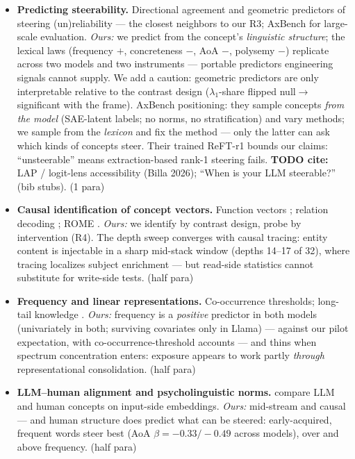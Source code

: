 \documentclass[11pt]{article}
\newenvironment{outline}{\color{gray!70!black}\begin{itemize}[leftmargin=1.2em,itemsep=1pt]}{\end{itemize}\color{black}}
\begin{document}
\begin{outline}
\item \textbf{Predicting steerability.} Directional agreement and geometric predictors of steering (un)reliability \citep{braun2025unreliability,braun2026geometric} --- the closest neighbors to our R3; AxBench \citep{wu2025axbench} for large-scale evaluation. \emph{Ours:} we predict from the concept's \emph{linguistic structure}; the lexical laws (frequency $+$, concreteness $-$, AoA $-$, polysemy $-$) replicate across two models and two instruments --- portable predictors engineering signals cannot supply. We add a caution: geometric predictors are only interpretable relative to the contrast design ($\lambda_1$-share flipped null$\to$significant with the frame). AxBench positioning: they sample concepts \emph{from the model} (SAE-latent labels; no norms, no stratification) and vary methods; we sample from the \emph{lexicon} and fix the method --- only the latter can ask which kinds of concepts steer. Their trained ReFT-r1 bounds our claims: ``unsteerable'' means extraction-based rank-1 steering fails. \textbf{TODO cite:} LAP / logit-lens accessibility (Billa 2026); ``When is your LLM steerable?'' (bib stubs). (1 para)
\item \textbf{Causal identification of concept vectors.} Function vectors \citep{todd2024function}; relation decoding \citep{hernandez2024linearity}; ROME \citep{meng2022rome}. \emph{Ours:} we identify by contrast design, probe by intervention (R4). The depth sweep converges with causal tracing: entity content is injectable in a sharp mid-stack window (depths 14--17 of 32), where tracing localizes subject enrichment --- but read-side statistics cannot substitute for write-side tests. (half para)
\item \textbf{Frequency and linear representations.} Co-occurrence thresholds; long-tail knowledge \citep{kandpal2023longtail}. \emph{Ours:} frequency is a \emph{positive} predictor in both models (univariately in both; surviving covariates only in Llama) --- against our pilot expectation, with co-occurrence-threshold accounts --- and thins when spectrum concentration enters: exposure appears to work partly \emph{through} representational consolidation. (half para)
\item \textbf{LLM--human alignment and psycholinguistic norms.} \citet{shani2025tokens} compare LLM and human concepts on input-side embeddings. \emph{Ours:} mid-stream and causal --- and human structure does predict what can be steered: early-acquired, frequent words steer best (AoA $\beta{=}-0.33/-0.49$ across models), over and above frequency. (half para)

\end{outline}
\end{document}
